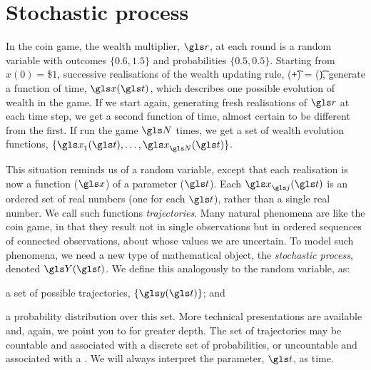 \section{Stochastic process}
In the coin game, the wealth multiplier, $\gr$, at each round is a random variable with outcomes $\{0.6,1.5\}$ and probabilities $\{0.5,0.5\}$. Starting from $x(0)=\$1$, successive realisations of the wealth updating rule,
\be
\x(\t+\dt) = \x(\t)\gr,
\ee
generate a function of time, $\x(\t)$, which describes one possible evolution of wealth in the game. If we start again, generating fresh realisations of $\gr$ at each time step, we get a second function of time, almost certain to be different from the first. If run the game $\N$ times, we get a set of wealth evolution functions, $\{\x_1(\t),\dots,\x_{\N}(\t)\}$.

This situation reminds us of a random variable, except that each realisation is now a function 
($\x$) of a parameter ($\t$). Each $\x_\gj(\t)$ is an ordered set of real numbers (one for each 
$\t$), rather than a single real number. We call such functions \textit{trajectories}. Many natural 
phenomena are like the coin game, in that they result not in single observations but in ordered 
sequences of connected observations, about whose values we are uncertain. To model such 
phenomena, we need a new type of mathematical object, the \textit{stochastic process}, 
denoted $\Y(\t)$. We define this analogously to the random variable, as:
\bi
\item a set of possible trajectories, $\{\y(\t)\}$; and
\item a probability distribution over this set.
\ei
More technical presentations are available and, again, we point you to \cite[p.~52]{vanKampen1992} 
for greater depth. The set of trajectories may be countable and associated with a discrete 
set of probabilities, or uncountable and associated with a \PDFa. 
We will always interpret 
the parameter, $\t$, as time.

